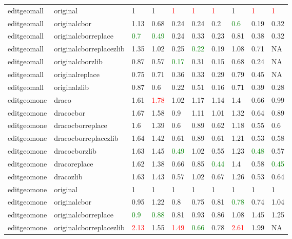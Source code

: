 \begin{landscape}
\begin{longtable}{llllllllll}
\rowcolor{lightgray}  editgeomall & original & 1 & 1 & \textcolor{red}{1} & \textcolor{red}{1} & \textcolor{red}{1} & 1 & \textcolor{red}{1} & \textcolor{red}{1}\\
\rowcolor{lightgray}  editgeomall & originalcbor & 1.13 & 0.68 & 0.24 & 0.24 & 0.2 & \textcolor{green}{0.6} & 0.19 & 0.32\\
editgeomall & originalcborreplace & \textcolor{green}{0.7} & \textcolor{green}{0.49} & 0.24 & 0.33 & 0.23 & 0.81 & 0.38 & 0.32\\
editgeomall & originalcborreplacezlib & 1.35 & 1.02 & 0.25 & \textcolor{green}{0.22} & 0.19 & 1.08 & 0.71 & NA\\
editgeomall & originalcborzlib & 0.87 & 0.57 & \textcolor{green}{0.17} & 0.31 & 0.15 & 0.68 & 0.24 & NA\\
editgeomall & originalreplace & 0.75 & 0.71 & 0.36 & 0.33 & 0.29 & 0.79 & 0.45 & NA\\
editgeomall & originalzlib & 0.87 & 0.6 & 0.22 & 0.51 & 0.16 & 0.71 & 0.39 & 0.28\\
editgeomone & draco & 1.61 & \textcolor{red}{1.78} & 1.02 & 1.17 & 1.14 & 1.4 & 0.66 & 0.99\\
editgeomone & dracocbor & 1.67 & 1.58 & 0.9 & 1.11 & 1.01 & 1.32 & 0.64 & 0.89\\
editgeomone & dracocborreplace & 1.6 & 1.39 & 0.6 & 0.89 & 0.62 & 1.18 & 0.55 & 0.6\\
editgeomone & dracocborreplacezlib & 1.64 & 1.42 & 0.61 & 0.89 & 0.61 & 1.21 & 0.53 & 0.58\\
editgeomone & dracocborzlib & 1.63 & 1.45 & \textcolor{green}{0.49} & 1.02 & 0.55 & 1.23 & \textcolor{green}{0.48} & 0.57\\
editgeomone & dracoreplace & 1.62 & 1.38 & 0.66 & 0.85 & \textcolor{green}{0.44} & 1.4 & 0.58 & \textcolor{green}{0.45}\\
editgeomone & dracozlib & 1.63 & 1.43 & 0.57 & 1.02 & 0.67 & 1.26 & 0.53 & 0.64\\
editgeomone & original & 1 & 1 & 1 & 1 & 1 & 1 & 1 & 1\\
\rowcolor{lightgray}  editgeomone & originalcbor & 0.95 & 1.22 & 0.8 & 0.75 & 0.81 & \textcolor{green}{0.78} & 0.74 & 1.04\\
\rowcolor{lightgray}  editgeomone & originalcborreplace & \textcolor{green}{0.9} & \textcolor{green}{0.88} & 0.81 & 0.93 & 0.86 & 1.08 & 1.45 & 1.25\\
\rowcolor{lightgray}  editgeomone & originalcborreplacezlib & \textcolor{red}{2.13} & 1.55 & \textcolor{red}{1.49} & \textcolor{green}{0.66} & 0.78 & \textcolor{red}{2.61} & 1.99 & NA\\

\end{longtable}
\end{landscape}
